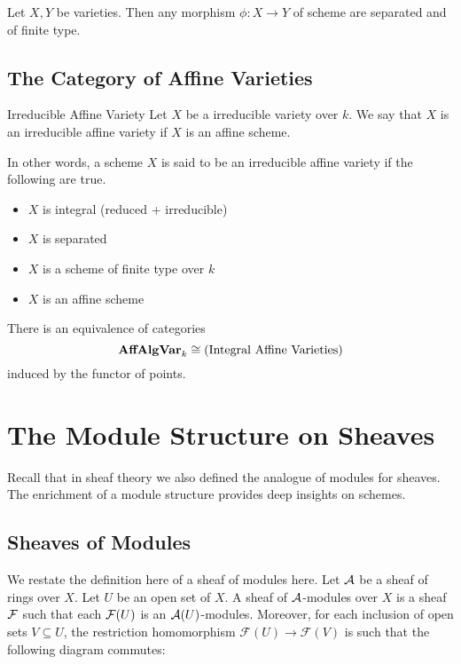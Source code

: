 \documentclass[a4paper]{article}
\begin{document}
\begin{prp}{}{} Let $X,Y$ be varieties. Then any morphism $\phi:X\to Y$ of scheme are separated and of finite type. 
\end{prp}

\subsection{The Category of Affine Varieties}
\begin{defn}{Irreducible Affine Variety}{} Let $X$ be a irreducible variety over $k$. We say that $X$ is an irreducible affine variety if $X$ is an affine scheme. 
\end{defn}

In other words, a scheme $X$ is said to be an irreducible affine variety if the following are true. 
\begin{itemize}
\item $X$ is integral (reduced + irreducible)
\item $X$ is separated
\item $X$ is a scheme of finite type over $k$
\item $X$ is an affine scheme
\end{itemize}

\begin{thm}{}{} There is an equivalence of categories $$\bold{AffAlgVar}_k\cong(\text{Integral Affine Varieties})$$ induced by the functor of points. 
\end{thm}

\pagebreak
\section{The Module Structure on Sheaves}
Recall that in sheaf theory we also defined the analogue of modules for sheaves. The enrichment of a module structure provides deep insights on schemes. 

\subsection{Sheaves of Modules}
We restate the definition here of a sheaf of modules here. Let $\mathcal{A}$ be a sheaf of rings over $X$. Let $U$ be an open set of $X$. A sheaf of $\mathcal{A}$-modules over $X$ is a sheaf $\mathcal{F}$ such that each $\mathcal{F}(U)$ is an $\mathcal{A}(U)$-modules. Moreover, for each inclusion of open sets $V\subseteq U$, the restriction homomorphism $\mathcal{F}(U)\to\mathcal{F}(V)$ is such that the following diagram commutes: \\~\\
\\~\\
\end{document}
